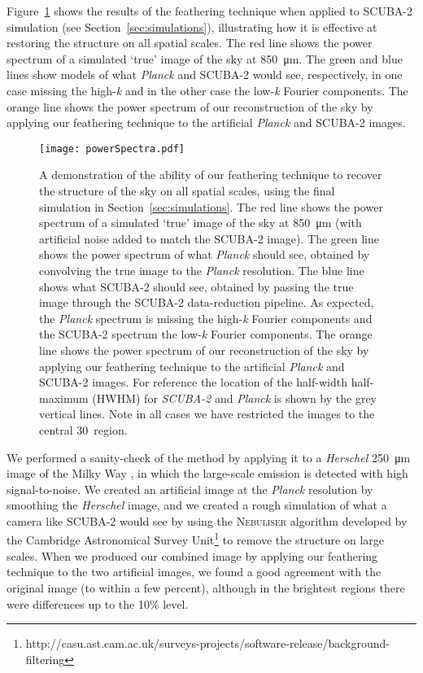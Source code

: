 \documentclass[a4paper,fleqn,usenatbib, twocolumn]{aastex63}
\begin{document}
Figure~\ref{fig:powerSpectrum} shows the results of the feathering technique when applied to SCUBA-2 simulation (see Section~\ref{sec:simulations}),
illustrating how it is effective at restoring the structure on all spatial scales.
The red line shows the power spectrum of a simulated `true' image of the sky at  \SI{850}{\micro\meter}. The green and blue lines show models of what {\it Planck} and SCUBA-2
would see, respectively, in one case missing the high-\textit{k} and in the other case
the low-\textit{k} Fourier components. The orange line shows the power spectrum of our
reconstruction of the sky by applying our feathering technique to the artificial
{\it Planck} and SCUBA-2 images.

\begin{figure}
  \centering
  \texttt{[image: powerSpectra.pdf]}
  \caption{A demonstration of the ability of our feathering technique to recover the
  structure of the sky on all spatial scales, using the final simulation
  in Section~\ref{sec:simulations}. The red line shows the power spectrum of a simulated `true' image of the sky at \SI{850}{\micro\meter} (with artificial noise added to match the SCUBA-2 image). The green line shows the power spectrum of what {\it Planck} should see, obtained by convolving the true
  image to the {\it Planck} resolution. The blue line shows what SCUBA-2
  should see, obtained by passing the true image through the SCUBA-2 data-reduction
  pipeline. As expected, the {\it Planck} spectrum is missing the high-\textit{k} Fourier
  components and the SCUBA-2 spectrum the low-\textit{k} Fourier components.
 The orange line shows the power spectrum of our
reconstruction of the sky by applying our feathering technique to the artificial
{\it Planck} and SCUBA-2 images. For reference the location of the half-width half-maximum (HWHM) for \textit{SCUBA-2} and 
\textit{Planck} is shown by the grey vertical lines. Note in all cases we have 
           restricted the images to the central 30\arcmin\ region. 
           }
  \label{fig:powerSpectrum}
\end{figure}

We performed a sanity-check of the method by applying it to a {\it Herschel}  \SI{250}{\micro\meter} image
of the Milky Way \citep{molinari2016}, in which the large-scale emission is detected
with high signal-to-noise. We created an artificial image at the {\it Planck} resolution by smoothing
the {\it Herschel} image, and we created
a rough simulation of what a camera like SCUBA-2 would see by using the
\textsc{Nebuliser} algorithm developed by the Cambridge Astronomical Survey Unit\footnote{http://casu.ast.cam.ac.uk/surveys-projects/software-release/background-filtering} to remove the
structure on large scales. When we produced our combined image by
applying our feathering technique to the two artificial images, we found a
good agreement with the original image (to within a few percent), although in the brightest regions there
were differences up to the 10\% level. 
\end{document}
